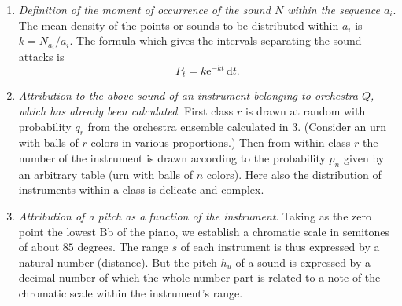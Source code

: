 \documentclass[letterpaper, 11pt]{article}
\begin{document}
\begin{enumerate}
        Fig. V-2 is expressed by the formula
        \[Q_r = (n-x)(e_{n,r} - e_{n+1,r}) + e_{n,r}\]
        in which \(r =\) the number of the class, \(x = \log_\mathrm{e}{\left[(\mathrm{DA})_i/(\mathrm{V}3)\right]}\), \(n = 0, 1, 2, \dots, R\), such that \(n \leq x \leq n + 1\), and \(e_{n,r}\) and \(e_{n+1,r}\) are the probabilities of class \(r\) as a function of \(n\).
        It goes without saying that the composition of this table is a precise task of great complexity and delicacy.
        Once these preliminaries have been completed, we can define, one after the other, the \(N_{a_i}\) sounds of sequence \(a_i\).
    \item
        \textit{Definition of the moment of occurrence of the sound \(N\) within the sequence \(a_i\)}.
        The mean density of the points or sounds to be distributed within \(a_i\) is \(k = N_{a_i} / a_i\).
        The formula which gives the intervals separating the sound attacks is
        \[P_t = k \mathrm{e}^{-kt} \, \mathrm{d}t. \tag{See Appendix I.}\]
    \item
        \textit{Attribution to the above sound of an instrument belonging to orchestra \(Q\), which has already been calculated}.
        First class \(r\) is drawn at random with probability \(q_r\) from the orchestra ensemble calculated in 3.
        (Consider an urn with balls of \(r\) colors in various proportions.)
        Then from within class \(r\) the number of the instrument is drawn according to the probability \(p_n\) given by an arbitrary table (urn with balls of \(n\) colors).
        Here also the distribution of instruments within a class is delicate and complex.
    \item
        \textit{Attribution of a pitch as a function of the instrument}.
        Taking as the zero point the lowest Bb of the piano, we establish a chromatic scale in semitones of about \(85\) degrees.
        The range \(s\) of each instrument is thus expressed by a natural number (distance).
        But the pitch \(h_u\) of a sound is expressed by a decimal number of which the whole number part is related to a note of the chromatic scale within the instrument's range.
        

\end{enumerate}
\end{document}
